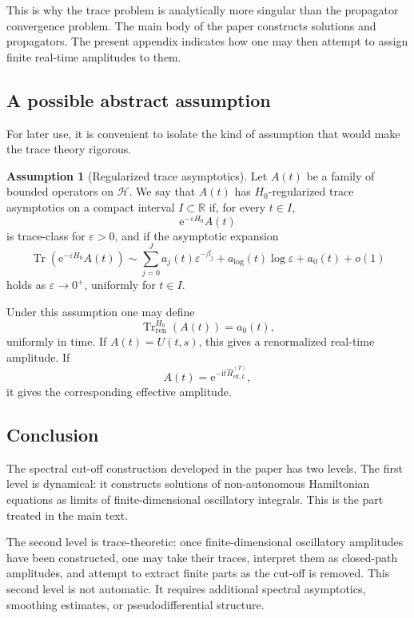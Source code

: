 \documentclass[11pt]{amsart}
\theoremstyle{plain}
\theoremstyle{definition}
\newtheorem{assumption}[theorem]{Assumption}
\theoremstyle{remark}
\newcommand{\Hilb}{\mathcal H}
\newcommand{\Tr}{\operatorname{Tr}}
\newcommand{\ii}{\mathrm i}
\newcommand{\ee}{\mathrm e}
\begin{document}
This is why the trace problem is analytically more singular than the
propagator convergence problem.  The main body of the paper constructs
solutions and propagators.  The present appendix indicates how one may
then attempt to assign finite real-time amplitudes to them.

\subsection{A possible abstract assumption}

For later use, it is convenient to isolate the kind of assumption that
would make the trace theory rigorous.

\begin{assumption}[Regularized trace asymptotics]
Let \(A(t)\) be a family of bounded operators on \(\Hilb\).  We say that
\(A(t)\) has \(H_0\)-regularized trace asymptotics on a compact interval
\(I\subset\mathbb R\) if, for every \(t\in I\),
\[
        \ee^{-\varepsilon H_0}A(t)
\]
is trace-class for \(\varepsilon>0\), and if the asymptotic expansion
\[
        \Tr(\ee^{-\varepsilon H_0}A(t))
        \sim
        \sum_{j=0}^{J} a_j(t)\varepsilon^{-\beta_j}
        +
        a_{\log}(t)\log\varepsilon
        +
        a_0(t)
        +
        o(1)
\]
holds as \(\varepsilon\to0^+\), uniformly for \(t\in I\).
\end{assumption}

Under this assumption one may define
\[
        \Tr_{\mathrm{ren}}^{H_0}(A(t))=a_0(t),
\]
uniformly in time.  If \(A(t)=U(t,s)\), this gives a renormalized
real-time amplitude.  If
\[
        A(t)=\ee^{-\ii t\widehat H_{\mathrm{eff},L}^{(T)}},
\]
it gives the corresponding effective amplitude.

\subsection{Conclusion}

The spectral cut-off construction developed in the paper has two
levels.  The first level is dynamical: it constructs solutions of
non-autonomous Hamiltonian equations as limits of finite-dimensional
oscillatory integrals.  This is the part treated in the main text.

The second level is trace-theoretic: once finite-dimensional
oscillatory amplitudes have been constructed, one may take their traces,
interpret them as closed-path amplitudes, and attempt to extract finite
parts as the cut-off is removed.  This second level is not automatic.
It requires additional spectral asymptotics, smoothing estimates, or
pseudodifferential structure.
\end{document}
